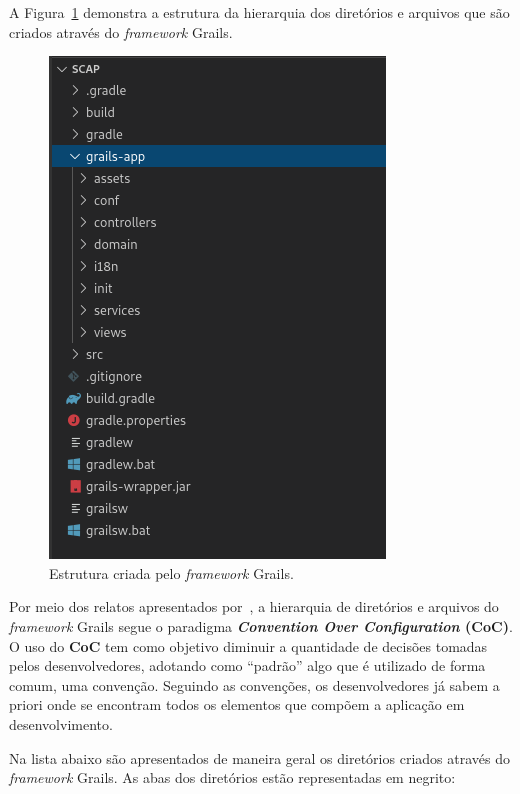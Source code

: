 A Figura~\ref{fig-projeto-estrutura-grails} demonstra a estrutura da hierarquia dos diretórios e arquivos que são criados através do \textit{framework} Grails.

\begin{figure}[!h]
	\centering
	\includegraphics[scale=0.7]{figuras/fig-projeto-estrutura-grails} 
	\caption{Estrutura criada pelo \textit{framework} Grails.}
	\label{fig-projeto-estrutura-grails}
\end{figure}

Por meio dos relatos apresentados por~, a hierarquia de diretórios e arquivos do \textit{framework} Grails segue o paradigma \textbf{\textit{Convention Over Configuration} (CoC)}. O uso do \textbf{CoC} tem como objetivo diminuir a quantidade de decisões tomadas pelos desenvolvedores, adotando como ``padrão'' algo que é utilizado de forma comum, uma convenção. Seguindo as convenções, os desenvolvedores já sabem a priori onde se encontram todos os elementos que compõem a aplicação em desenvolvimento.

Na lista abaixo são apresentados de maneira geral os diretórios criados através do \textit{framework} Grails. As abas dos diretórios estão representadas em negrito:

